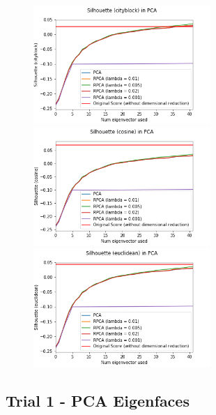 \documentclass[11pt]{scrartcl} %
\theoremstyle{plain}
\begin{document}
\begin{figure}[H]
\centering
\includegraphics[width=0.6\textwidth]{figures/rpcatrial2cityblock.png}\\
\includegraphics[width=0.6\textwidth]{figures/rpcatrial2cosine.png}\\
\includegraphics[width=0.6\textwidth]{figures/rpcatrial2euclidean.png}\\
\end{figure}


\subsection{Trial 1 - PCA Eigenfaces}
\end{document}
